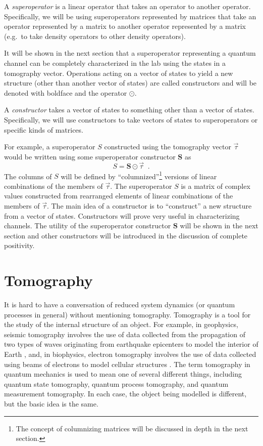 \begin{definition}
A {\em superoperator} is a linear operator that takes an operator to another operator.  Specifically, we will be using superoperators represented by matrices that take an operator represented by a matrix to another operator represented by a matrix (e.g.\ to take density operators to other density operators).
\end{definition}

It will be shown in the next section that a superoperator representing a quantum channel can be completely characterized in the lab using the states in a tomography vector.  Operations acting on a vector of states to yield a new structure (other than another vector of states) are called constructors and will be denoted with boldface and the operator $\odot$.  
\begin{definition}
A {\em constructor} takes a vector of states to something other than a vector of states.  Specifically, we will use constructors to take vectors of states to superoperators or specific kinds of matrices.
\end{definition}

For example, a superoperator $S$ constructed using the tomography vector $\vec{\tau}$ would be written using some superoperator constructor $\mathbf{S}$ as
$$
S = \mathbf{S}\odot \vec{\tau}\;\;.
$$
The columns of $S$ will be defined by ``columnized''\footnote{The concept of columnizing matrices will be discussed in depth in the next section.} versions of linear combinations of the members of $\vec{\tau}$.  The superoperator $S$ is a matrix of complex values constructed from rearranged elements of linear combinations of the members of $\vec{\tau}$.  The main idea of a constructor is to ``construct'' a new structure from a vector of states.  Constructors will prove very useful in characterizing channels.  The utility of the superoperator constructor $\mathbf{S}$ will be shown in the next section and other constructors will be introduced in the discussion of complete positivity.

\section{Tomography}
\label{sec:tomo}

It is hard to have a conversation of reduced system dynamics (or quantum processes in general) without mentioning tomography.  Tomography is a tool for the study of the internal structure of an object.  For example, in geophysics, seismic tomography involves the use of data collected from the propagation of two types of waves originating from earthquake epicenters to model the interior of Earth \cite{Lo1994}, and, in biophysics, electron tomography involves the use of data collected using beams of electrons to model cellular structures \cite{Frank2006}.  The term tomography in quantum mechanics is used to mean one of several different things, including quantum state tomography, quantum process tomography, and quantum measurement tomography.  In each case, the object being modelled is different, but the basic idea is the same.

